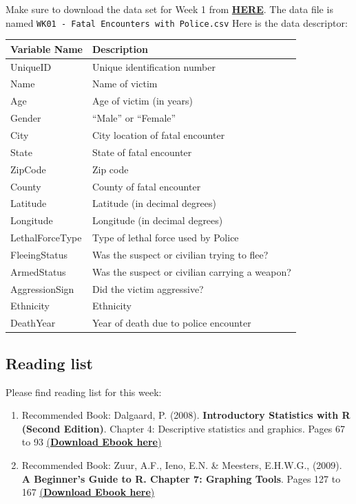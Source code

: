 \documentclass[
]{book}
\begin{document}
Make sure to download the data set for Week 1 from \href{https://github.com/UCLPG-MSC-SGDS/GEOG0125/raw/main/Dataset.zip}{\textbf{HERE}}. The data file is named \texttt{WK01\ -\ Fatal\ Encounters\ with\ Police.csv} Here is the data descriptor:

\begin{longtable}[]{@{}ll@{}}
\toprule
\textbf{Variable Name} & \textbf{Description} \\
\midrule
\endhead
UniqueID & Unique identification number \\
Name & Name of victim \\
Age & Age of victim (in years) \\
Gender & ``Male'' or ``Female'' \\
City & City location of fatal encounter \\
State & State of fatal encounter \\
ZipCode & Zip code \\
County & County of fatal encounter \\
Latitude & Latitude (in decimal degrees) \\
Longitude & Longitude (in decimal degrees) \\
LethalForceType & Type of lethal force used by Police \\
FleeingStatus & Was the suspect or civilian trying to flee? \\
ArmedStatus & Was the suspect or civilian carrying a weapon? \\
AggressionSign & Did the victim aggressive? \\
Ethnicity & Ethnicity \\
DeathYear & Year of death due to police encounter \\
\bottomrule
\end{longtable}

\hypertarget{reading-list}{%
\subsection{Reading list}\label{reading-list}}

Please find reading list for this week:

\begin{enumerate}
\def\labelenumi{\arabic{enumi}.}
\item
  Recommended Book: Dalgaard, P. (2008). \textbf{Introductory Statistics with R (Second Edition)}. Chapter 4: Descriptive statistics and graphics. Pages 67 to 93 \href{https://link.springer.com/book/10.1007/978-0-387-79054-1}{(\textbf{Download Ebook here})}
\item
  Recommended Book: Zuur, A.F., Ieno, E.N. \& Meesters, E.H.W.G., (2009). \textbf{A Beginner's Guide to R. Chapter 7: Graphing Tools}. Pages 127 to 167 \href{https://link.springer.com/book/10.1007/978-0-387-93837-0}{(\textbf{Download Ebook here})}
\end{enumerate}
\end{document}
